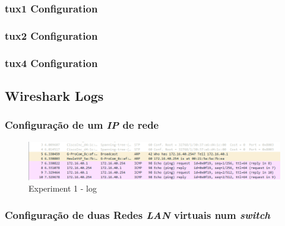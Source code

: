 \documentclass[a4paper]{article}
\begin{document}
	\lstset{title=Anexo 10 - Switch Configuration}
	

	\clearpage

	\subsubsection{tux1 Configuration}
	
	\lstset{title=Anexo 11 - tux1 Final Configuration}
	

	\subsubsection{tux2 Configuration}
	
	\lstset{title=Anexo 12 - tux2 Final Configuration}
	

	\subsubsection{tux4 Configuration}
	
	\lstset{title=Anexo 13 - tux4 Final Configuration}
	

	\subsection{Wireshark Logs}

	\subsubsection{Configuração de um \textit{IP} de rede}

	\begin{figure}[H]
	\begin{center}
  	\includegraphics[width=\linewidth]{exp1_wireshark.png}
  	\caption{Experiment 1 - log}
  	\label{fig:Experiment 1 - log}
	\end{center}
	\end{figure}

	\subsubsection{Configuração de duas Redes \textit{LAN} virtuais num \textit{switch}}
	
\end{document}
